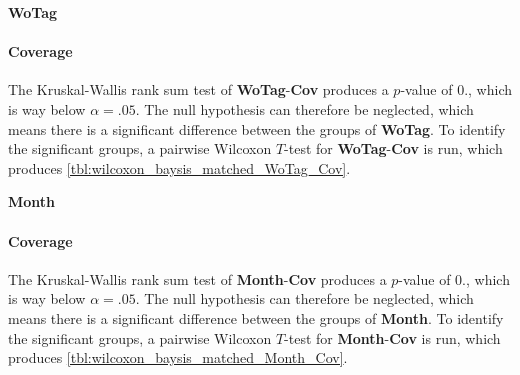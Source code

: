 \Large
\centerline{\textbf{WoTag}}
\normalsize

\paragraph{Coverage}
The Kruskal-Wallis rank sum test of \textbf{WoTag}-\textbf{Cov} produces a $p$-value of 0., which is way below $\alpha=.05$. The null hypothesis can therefore be neglected, which means there is a significant difference between the groups of \textbf{WoTag}. To identify the significant groups, a pairwise Wilcoxon $T$-test for \textbf{WoTag}-\textbf{Cov} is run, which produces \autoref{tbl:wilcoxon_baysis_matched_WoTag_Cov}. 

\Large
\centerline{\textbf{Month}}
\normalsize

\paragraph{Coverage}
The Kruskal-Wallis rank sum test of \textbf{Month}-\textbf{Cov} produces a $p$-value of 0., which is way below $\alpha=.05$. The null hypothesis can therefore be neglected, which means there is a significant difference between the groups of \textbf{Month}. To identify the significant groups, a pairwise Wilcoxon $T$-test for \textbf{Month}-\textbf{Cov} is run, which produces \autoref{tbl:wilcoxon_baysis_matched_Month_Cov}. 